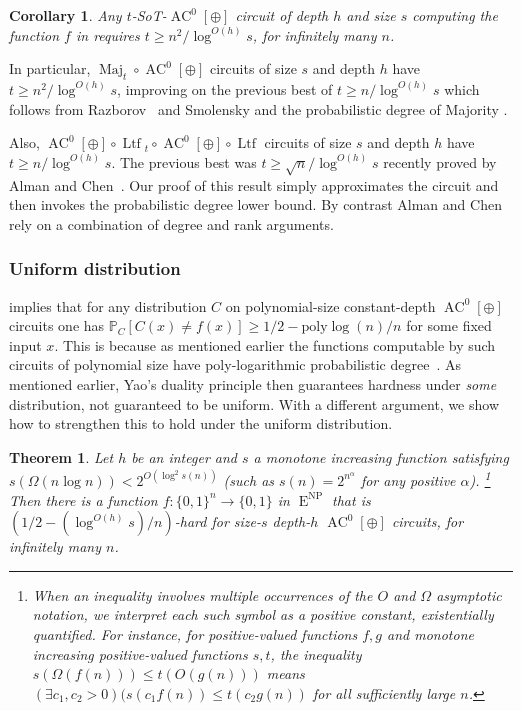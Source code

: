 \documentclass{toc}
\newtheorem{thm}[theorem]{Theorem}
\newtheorem{cor}[theorem]{Corollary}
\DeclareMathOperator{\Maj}{\mathrm{Maj}}  %
\DeclareMathOperator{\Ltf}{\mathrm{Ltf}}  %
\DeclareMathOperator{\AC}{\mathrm{AC}}  %
\DeclareMathOperator{\NP}{\mathrm{NP}}  %
\DeclareMathOperator{\EEE}{\mathrm{E}}  %
\newcommand{\zo}{\{0, 1\}}
\renewcommand{\P}{\mathbb{P}}
\newcommand{\poly}{\mathrm{poly}}
\begin{document}
\begin{cor}
\label{cor:SOT-lower-bounds} Any $t$-SoT-$\AC^{0}[\oplus]$ circuit
of depth $h$ and size $s$ computing the function $f$ in  requires $t\ge n^{2}/\log^{O(h)}s$,
for infinitely many $n$.
\end{cor}

In particular, $\Maj_{t}\circ \AC^{0}[\oplus]$ circuits of size $s$
and depth $h$ have $t\ge n^{2}/\log^{O(h)}s$, improving on the previous
best of $t\ge n/\log^{O(h)}s$ which follows from Razborov~\cite{Raz87}
and Smolensky \cite{Smo87,Smolensky93} and the probabilistic degree
of Majority \cite{DBLP:conf/fsttcs/Srinivasan13,DBLP:conf/focs/AlmanW15}.

Also, $\AC^{0}[\oplus]\circ \Ltf{}_{t}\circ \AC^{0}[\oplus]\circ \Ltf$
circuits of size $s$ and depth $h$ have $t\ge n/\log^{O(h)}s$.
The previous best was $t\ge\sqrt{n}/\log^{O(h)}s$ recently proved
by Alman and Chen~\cite{AlmanC19}. Our proof of this result simply
approximates the circuit and then invokes the probabilistic degree
lower bound. By contrast Alman and Chen rely on a combination of degree
and rank arguments.

\subsubsection{Uniform distribution}

 implies that for any distribution $C$
on polynomial-size constant-depth $\AC^{0}[\oplus]$ circuits one has
$\P_{C}[C(x)\ne f(x)]\ge1/2-\poly\log(n)/n$ for some fixed input
$x$. This is because as mentioned earlier the functions computable
by such circuits of %
polynomial size  %
have poly-logarithmic probabilistic
degree~\cite{Raz87}. As mentioned earlier, Yao's duality principle
\cite{DBLP:conf/focs/Yao77} then guarantees hardness under \emph{some
}distribution, not guaranteed to be uniform. With a different argument,
we show how to strengthen this to hold under the uniform distribution.
\begin{thm}
  \label{thm:uniform} Let $h$ be an integer and $s$ a
monotone increasing  %
function satisfying
%
%
$s(\Omega(n\log n)) < 2^{O(\log^{2}s(n))}$  %
%
%
%
%
(such as $s(n)=2^{n^{\alpha}}$
for any
positive  %
$\alpha$).%
\footnote{When an inequality involves multiple occurrences of the $O$ and $\Omega$
  asymptotic notation, we interpret each such symbol as a positive constant,
  existentially quantified.  For instance, for positive-valued functions $f,g$ and
  monotone increasing positive-valued functions $s,t$, the inequality
  $s(\Omega(f(n)))\le t(O(g(n)))$ means $(\exists c_1, c_2 > 0)
  (s(c_1 f(n)) \le t(c_2 g(n))$ for all sufficiently large $n$.}
%
%
%
%
Then there %
is a function $f:\zo^{n}\to\zo$ in $\EEE^{\NP}$ that is $(1/2-(\log^{O(h)}s)/n)$-hard
for size-$s$ depth-$h$ $\AC^{0}[\oplus]$ circuits, for infinitely
many $n$.
\end{thm}
%
\end{document}
